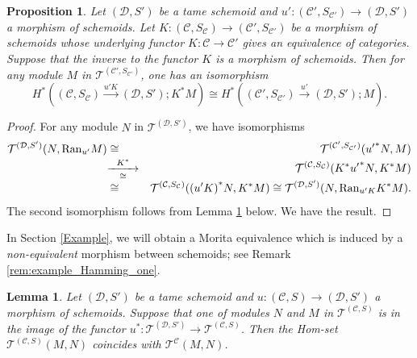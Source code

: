\documentclass{amsart}
\newtheorem{prop}[thm]{Proposition}
\newtheorem{lem}[thm]{Lemma}
\theoremstyle{definition}
\theoremstyle{remark}
\newcommand{\C}{{\mathcal C}}
\newcommand{\T}{{\mathcal T}}
\newcommand{\D}{\mathcal{D}}
\newcommand{\maprightud}[2]{%
\smash{\mathop{%
 \hbox to 1cm{\rightarrowfill}}\limits^{#1}_{#2}}}
\newcounter{eqn}[section]
\begin{document}
\begin{prop}\label{prop:invariant}
Let $(\D, S')$ be a tame schemoid and $u' : (\C', S_{\C'}) \to (\D, S')$ a morphism of schemoids. 
Let $K :  (\C, S_{\C}) \to (\C', S_{\C'})$ be a morphism of schemoids whose underlying functor 
$K: \C \to \C'$ gives an equivalence of categories.  Suppose that the inverse to the functor $K$ is a morphism of schemoids. 
Then for any module $M$ in $\T^{(\C', S_{\C'})}$, one has an isomorphism
$$
H^*( (\C, S_{\C}) \stackrel{u'K}{\to} (\D, S') ; K^*M) \cong H^*( (\C', S_{\C'}) \stackrel{u'}{\to} (\D, S') ; M). 
$$
\end{prop}

\begin{proof}
For any module $N$ in $\T^{(\D, S')}$, 
we have isomorphisms 
\begin{eqnarray*}
\T^{(\D, S')}(N, \text{Ran}_{u'}M) &\cong & \T^{(\C', S_{\C'})}({u'}^*N, M) \\
&\maprightud{{K}^*}{\cong}&  \T^{(\C, S_{\C})}({K}^*{u'}^*N, {K}^*M) \\
&\cong & \T^{(\C, S_{\C})}({(u'K)}^*N, K^*M) \cong \T^{(\D, S')}(N, \text{Ran}_{u'K}K^*M). 
\end{eqnarray*}
The second isomorphism follows from Lemma \ref{lem:coincides} below. We have the result. 
\end{proof}

In Section \ref{Example}, we will obtain a Morita equivalence which is induced by a {\it non-equivalent} 
morphism between schemoids; see Remark \ref{rem:example_Hamming_one}.

\begin{lem}\label{lem:coincides}
Let $(\D, S')$ be a tame schemoid and $u : (\C, S) \to (\D, S')$ a morphism of schemoids. 
Suppose that one of modules $N$ and $M$ in $\T^{(\C, S)}$ is in the image of the 
functor $u^* : \T^{(\D, S')} \to \T^{(\C, S)}$. Then the Hom-set $\T^{(\C, S)}(M, N)$ coincides with 
$\T^{\C}(M, N)$.
\end{lem}
\end{document}
